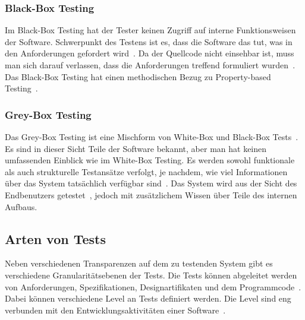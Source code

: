 \subsubsection{Black-Box Testing}

Im Black-Box Testing hat der Tester keinen Zugriff auf interne Funktionsweisen der Software.
Schwerpunkt des Testens ist es, dass die Software das tut, was in den Anforderungen gefordert wird~\cite[vgl. Specification-Based Testing]{software-testing-craftmans}.
Da der Quellcode nicht einsehbar ist, muss man sich darauf verlassen, dass die Anforderungen treffend formuliert wurden~\cite[vgl.]{testmanagment}.
Das Black-Box Testing hat einen methodischen Bezug zu Property-based Testing~\cite{property-based-testing}.

\subsubsection{Grey-Box Testing}

Das Grey-Box Testing ist eine Mischform von White-Box und Black-Box Tests~\cite[vgl.]{testmanagment}.
Es sind in dieser Sicht Teile der Software bekannt, aber man hat keinen umfassenden Einblick wie im White-Box Testing.
Es werden sowohl funktionale als auch strukturelle Testansätze verfolgt, je nachdem, wie viel Informationen über das System tatsächlich
verfügbar sind~\cite[vgl.]{graybox}.
Das System wird aus der Sicht des Endbenutzers getestet~\cite[vgl.]{testmanagment}, jedoch mit zusätzlichem Wissen über Teile des internen Aufbaus.

\subsection{Arten von Tests}

Neben verschiedenen Transparenzen auf dem zu testenden System gibt es verschiedene Granularitätsebenen der Tests.
Die Tests können abgeleitet werden von Anforderungen, Spezifikationen, Designartifikaten und dem Programmcode~\cite[vgl. 1.1.1 Testing Levels Based on Software Activity]{software-testing}.
Dabei können verschiedene Level an Tests definiert werden.
Die Level sind eng verbunden mit den Entwicklungsaktivitäten einer Software~\cite[vgl. 1.1.1]{software-testing}.

